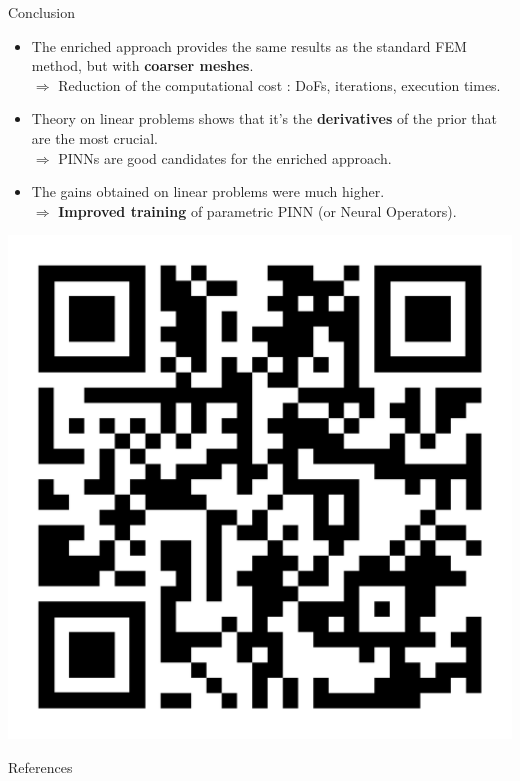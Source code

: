 \documentclass[compress,10pt,xcolor={table,dvipsnames},t]{beamer} %
\begin{document}
	\begin{frame}{Conclusion}
		\begin{itemize}
			\item The enriched approach provides the same results as the standard FEM method, but with \textbf{coarser meshes}. \\
			$\Rightarrow$ Reduction of the computational cost : DoFs, iterations, execution times.
			\item Theory on linear problems shows that it's the \textbf{derivatives} of the prior that are the most crucial. \\
			$\Rightarrow$ PINNs are good candidates for the enriched approach.
			\item The gains obtained on linear problems were much higher. \\
			$\Rightarrow$ \textbf{Improved training} of parametric PINN (or Neural Operators).
		\end{itemize}

		\flushright
		\begin{minipage}{0.05\linewidth}
			\flushright
		\end{minipage} \; \begin{minipage}{0.28\linewidth}
		\includegraphics[width=\linewidth]{images/qrcode_paper.pdf}
		\end{minipage}
	\end{frame}

	\BackgroundBiblio
	
	{ 	
	\begin{frame}{References}
		\scriptsize
		
	\end{frame}
	}
	\addtocounter{framenumber}{-1} 
	
	\Background

	
	\appendix
	
	
	
\end{document}
